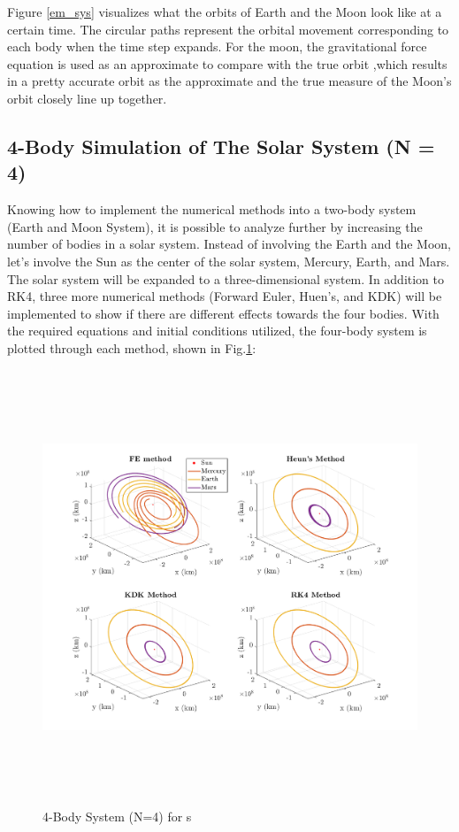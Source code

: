 \documentclass[conf]{new-aiaa}
\begin{document}
    Figure \ref{em_sys} visualizes what the orbits of Earth and the Moon look like at a certain time. The circular paths represent the orbital movement corresponding to each body when the time step expands. For the moon, the gravitational force equation is used as an approximate to compare with the true orbit ,which results in a pretty accurate orbit as the approximate and the true measure of the Moon's orbit closely line up together. 
    
    \subsection{4-Body Simulation of The Solar System (N = 4)}
    \label{4_bod}
    Knowing how to implement the numerical methods into a two-body system (Earth and Moon System), it is possible to analyze further by increasing the number of bodies in a solar system. Instead of involving the Earth and the Moon, let's involve the Sun as the center of the solar system, Mercury, Earth, and Mars. The solar system will be expanded to a three-dimensional system. In addition to RK4, three more numerical methods (Forward Euler, Huen's, and KDK) will be implemented to show if there are different effects towards the four bodies. With the required equations and initial conditions utilized, the four-body system is plotted through each method, shown in Fig.\ref{fig:em system}:
    \begin{figure}[H]
        \centering
        \includegraphics[height=13cm]{Figures/Implementation/4body system step100.png}
        \caption{4-Body System (N=4) for  s}
        \label{fig:em system}
    \end{figure}
\end{document}

